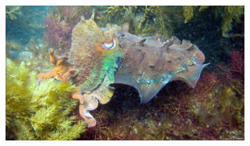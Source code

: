\documentclass[a4paper,12pt]{ctexart}
\begin{document}
\begin{figure}[h]
    \centering
    \begin{subfigure}{0.5\textwidth}
        \centering
        \includegraphics[width=\linewidth]{figures/CAMO_demo1/CAMO_demo1_ori.png}
        \label{fig:demo1_ori}
    \end{subfigure} \\


\end{figure}
\end{document}
